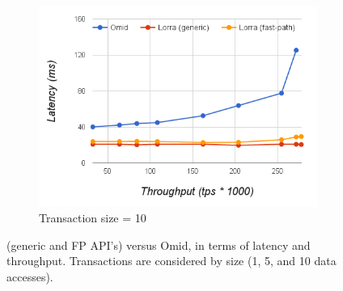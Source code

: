 \begin{figure}[t]
\begin{subfigure}[t]{0.33\textwidth}
	\includegraphics[width=\textwidth]{figs/thpt-latency-10.png}
	\caption[]{Transaction size = 10}
    \label{fig:tl-10}
  \end{subfigure}			
  \caption{{\sys} (generic and FP API's) versus Omid, in terms of latency and throughput. Transactions are considered
by size (1, 5, and 10 data accesses). }
  \label{fig:throughput-latency}
\end{figure}

